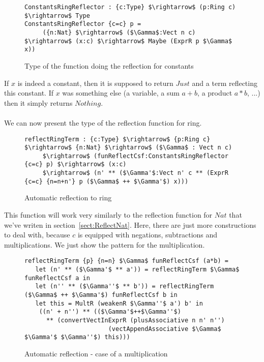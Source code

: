 \begin{figure}[H]
\figrule
\begin{center}
\begin{lstlisting}
ConstantsRingReflector : {c:Type} $\rightarrow$ (p:Ring c) $\rightarrow$ Type
ConstantsRingReflector {c=c} p = 
     ({n:Nat} $\rightarrow$ ($\Gamma$:Vect n c) $\rightarrow$ (x:c) $\rightarrow$ Maybe (ExprR p $\Gamma$ x))
\end{lstlisting}
\end{center}
\caption{Type of the function doing the reflection for constants}
\label{ConstantsRingReflector}
\figrule
\end{figure}

If $x$ is indeed a constant, then it is supposed to return $Just$ and a term reflecting this constant. If $x$ was something else (a variable, a sum $a+b$, a product $a*b$, ...) then it simply returns $Nothing$. \\
\\
We can now present the type of the reflection function for ring.

\begin{figure}[H]
\figrule
\begin{center}
\begin{lstlisting}
reflectRingTerm : {c:Type} $\rightarrow$ {p:Ring c} $\rightarrow$ {n:Nat} $\rightarrow$ ($\Gamma$ : Vect n c) 
     $\rightarrow$ (funReflectCsf:ConstantsRingReflector {c=c} p) $\rightarrow$ (x:c) 
     $\rightarrow$ (n' ** ($\Gamma'$:Vect n' c ** (ExprR {c=c} {n=n+n'} p ($\Gamma$ ++ $\Gamma'$) x)))
\end{lstlisting}
\end{center}
\caption{Automatic reflection to ring}
\label{reflectRingTermType}
\figrule
\end{figure}

This function will work very similarly to the reflection function for $Nat$ that we've writen in section~\ref{sect:ReflectNat}. Here, there are just more constructions to deal with, because $c$ is equipped with negations, subtractions and multiplications. We just show the pattern for the multiplication.

\begin{figure}[H]
\figrule
\begin{center}
\begin{lstlisting}
reflectRingTerm {p} {n=n} $\Gamma$ funReflectCsf (a*b) = 
   let (n' ** ($\Gamma'$ ** a')) = reflectRingTerm $\Gamma$ funReflectCsf a in
   let (n'' ** ($\Gamma''$ ** b')) = reflectRingTerm ($\Gamma$ ++ $\Gamma'$) funReflectCsf b in
   let this = MultR (weakenR $\Gamma''$ a') b' in
	((n' + n'') ** (($\Gamma'$++$\Gamma''$) 
	  ** (convertVectInExprR (plusAssociative n n' n'')
	                   (vectAppendAssociative $\Gamma$ $\Gamma'$ $\Gamma''$) this)))
\end{lstlisting}
\end{center}
\caption{Automatic reflection - case of a multiplication}
\label{reflectRingTerm_pattern1}
\figrule
\end{figure}


